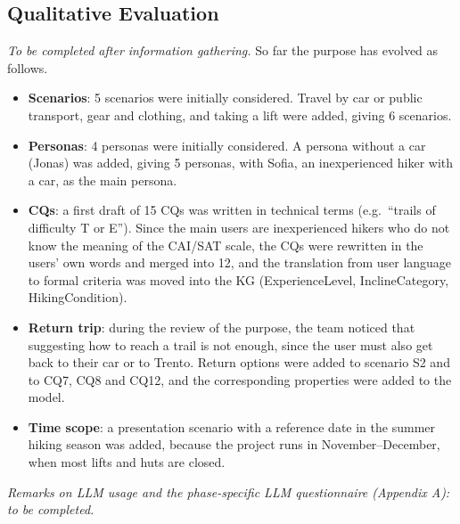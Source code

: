 \subsection{Qualitative Evaluation}
\label{sec:purpose-eval}
\textit{To be completed after information gathering.} So far the purpose has evolved as follows.
\begin{itemize}
    \item \textbf{Scenarios}: 5 scenarios were initially considered. Travel by car or public transport, gear and clothing, and taking a lift were added, giving 6 scenarios.
    \item \textbf{Personas}: 4 personas were initially considered. A persona without a car (Jonas) was added, giving 5 personas, with Sofia, an inexperienced hiker with a car, as the main persona.
    \item \textbf{CQs}: a first draft of 15 CQs was written in technical terms (e.g.\ ``trails of difficulty T or E''). Since the main users are inexperienced hikers who do not know the meaning of the CAI/SAT scale, the CQs were rewritten in the users' own words and merged into 12, and the translation from user language to formal criteria was moved into the KG (ExperienceLevel, InclineCategory, HikingCondition).
    \item \textbf{Return trip}: during the review of the purpose, the team noticed that suggesting how to reach a trail is not enough, since the user must also get back to their car or to Trento. Return options were added to scenario S2 and to CQ7, CQ8 and CQ12, and the corresponding properties were added to the model.
    \item \textbf{Time scope}: a presentation scenario with a reference date in the summer hiking season was added, because the project runs in November--December, when most lifts and huts are closed.
\end{itemize}

\noindent \textit{Remarks on LLM usage and the phase-specific LLM questionnaire (Appendix A): to be completed.}
